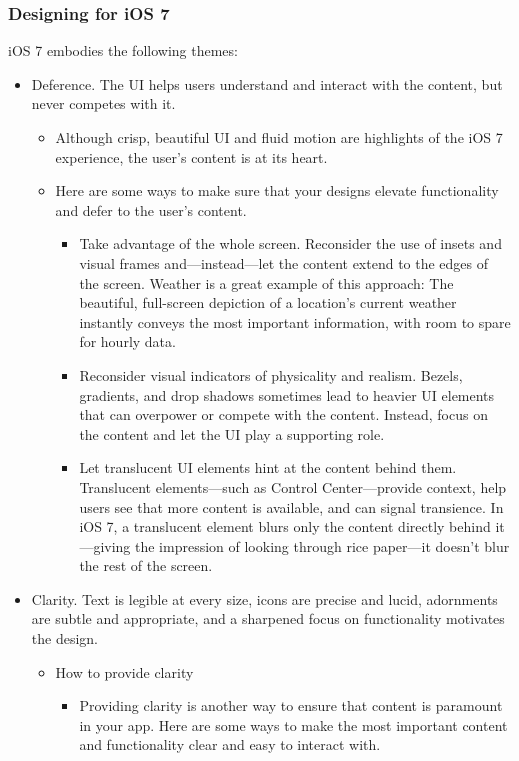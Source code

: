 \subsubsection*{Designing for iOS 7}
iOS 7 embodies the following themes:
\begin{itemize}
\item Deference. The UI helps users understand and interact with the content, but never competes with it.
	\begin{itemize}
    \item Although crisp, beautiful UI and fluid motion are highlights of the iOS 7 experience, the user’s content is at its heart.
	\item Here are some ways to make sure that your designs elevate functionality and defer to the user’s content.
		\begin{itemize}
		\item Take advantage of the whole screen. Reconsider the use of insets and visual frames and—instead—let the content extend to the edges of the screen. Weather is a great example of this approach: The beautiful, full-screen depiction of a location’s current weather instantly conveys the most important information, with room to spare for hourly data.
		\item Reconsider visual indicators of physicality and realism. Bezels, gradients, and drop shadows sometimes lead to heavier UI elements that can overpower or compete with the content. Instead, focus on the content and let the UI play a supporting role.
		\item Let translucent UI elements hint at the content behind them. Translucent elements—such as Control Center—provide context, help users see that more content is available, and can signal transience. In iOS 7, a translucent element blurs only the content directly behind it—giving the impression of looking through rice paper—it doesn’t blur the rest of the screen.
		\end{itemize}
	\end{itemize}
\item Clarity. Text is legible at every size, icons are precise and lucid, adornments are subtle and appropriate, and a sharpened focus on functionality motivates the design.
	\begin{itemize}
	\item How to provide clarity
		\begin{itemize}
		\item Providing clarity is another way to ensure that content is paramount in your app. Here are some ways to make the most important content and functionality clear and easy to interact with.

\end{itemize}
\end{itemize}
\end{itemize}
